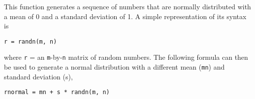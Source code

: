 \documentclass[../main.tex]{subfiles}
\begin{document}
\noindent This function generates a sequence of numbers that are normally distributed with a mean
of 0 and a standard deviation of 1. A simple representation of its syntax is

\begin{lstlisting}[numbers=none]
	r = randn(m, n)
\end{lstlisting}

\noindent where \texttt{r} = an \texttt{m}-by-\texttt{n} matrix of random numbers. The following formula can then be used
to generate a normal distribution with a different mean (\texttt{mn}) and standard deviation (s),

\begin{lstlisting}[numbers=none]
	rnormal = mn + s * randn(m, n)
\end{lstlisting}
\end{document}
